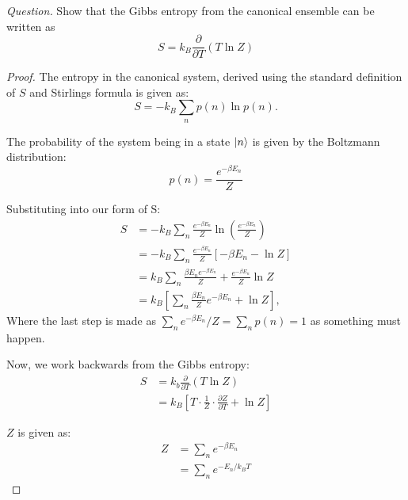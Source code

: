 \documentclass[11pt]{article}
\DeclarePairedDelimiter\ket{\lvert}{\rangle}
\begin{document}
\textit{Question.} Show that the Gibbs entropy from the canonical ensemble can be written as 
\begin{equation}
    S = k_B \frac{\partial}{\partial T}(T\ln Z)
\end{equation}
\begin{proof}
    The entropy in the canonical system, derived using the standard definition of $S$ and Stirlings formula is given as:
    \begin{equation}
        S = - k_B \sum_n p(n) \ln p(n).
    \end{equation}

    The probability of the system being in a state $\ket{n}$ is given by the Boltzmann distribution:
    \begin{equation}
        p(n)= \frac{e^{-\beta E_n}}{Z}
    \end{equation}

    Substituting into our form of S:
    \begin{equation}
        \begin{aligned}
            S &= -k_B \sum_n \frac{e^{-\beta E_n}}{Z} \ln \left(\frac{e^{-\beta E_n}}{Z}\right) \\
            &= - k_B \sum_n \frac{e^{-\beta E_n}}{Z} \left[-\beta E_n - \ln Z\right] \\
            &= k_B \sum_n \frac{\beta E_ne^{-\beta E_n}}{Z} + \frac{e^{-\beta E_n}}{Z} \ln Z \\
            &= k_B \left[ \sum_n \frac{\beta E_n}{Z} e^{-\beta E_n} + \ln Z\right],
        \end{aligned}   
    \end{equation}
Where the last step is made as $\sum_n e^{-\beta E_n}/Z = \sum_n p(n) =1$ as something must happen.

Now, we work backwards from the Gibbs entropy:
\begin{equation}
    \begin{aligned}
        S &= k_b \frac{\partial}{\partial T} (T \ln Z) \\
        & = k_B \left[T \cdot \frac{1}{Z} \cdot \frac{\partial Z}{\partial T} + \ln Z\right]
    \end{aligned}
\end{equation}

$Z$ is given as: 
\begin{equation}
    \begin{aligned}
        Z &= \sum_n e^{-\beta E_n} \\
        &= \sum_n e^{-E_n/k_BT}
    \end{aligned}
\end{equation}


\end{proof}
\end{document}
